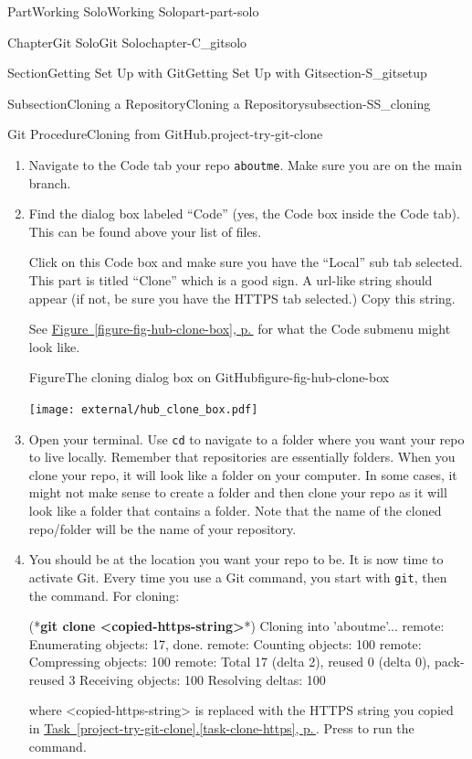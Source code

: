 \documentclass[twoside,10pt,]{book}
\newcommand{\xreffont}{\relax}
\newcommand{\mono}[1]{\texttt{#1}}
\newcommand{\consoleinput}[1]{\textbf{#1}}
\newcommand{\kbd}[1]{\keys{{#1}}}
\begin{document}
\begin{partptx}{Part}{Working Solo}{}{Working Solo}{}{}{part-part-solo}
\begin{chapterptx}{Chapter}{Git Solo}{}{Git Solo}{}{}{chapter-C_gitsolo}
\begin{sectionptx}{Section}{Getting Set Up with Git}{}{Getting Set Up with Git}{}{}{section-S_gitsetup}
\begin{subsectionptx}{Subsection}{Cloning a Repository}{}{Cloning a Repository}{}{}{subsection-SS_cloning}
\begin{project}{Git Procedure}{Cloning from GitHub.}{project-try-git-clone}
\begin{enumerate}[font=\bfseries,label=(\alph*),ref=\alph*]%
\item{}Navigate to the Code tab your repo \mono{aboutme}. Make sure you are on the main branch.%
\item\label{task-clone-https}Find the dialog box labeled ``Code'' (yes, the Code box inside the Code tab). This can be found above your list of files.%
\par
Click on this Code box and make sure you have the ``Local'' sub tab selected. This part is titled ``Clone'' which is a good sign. A url-like string should appear (if not, be sure you have the HTTPS tab selected.) Copy this string.%
\par
See \hyperref[figure-fig-hub-clone-box]{Figure~{\xreffont\ref{figure-fig-hub-clone-box}}, p.\,\pageref{figure-fig-hub-clone-box}} for what the Code submenu might look like.%
\begin{figureptx}{Figure}{The cloning dialog box on GitHub}{figure-fig-hub-clone-box}{}%
\begin{image}{0.2}{0.6}{0.2}{}%
\texttt{[image: external/hub\_clone\_box.pdf]}
\end{image}%
\tcblower
\end{figureptx}%
\item{}Open your terminal. Use \mono{cd} to navigate to a folder where you want your repo to live locally. Remember that repositories are essentially folders. When you clone your repo, it will look like a folder on your computer. In some cases, it might not make sense to create a folder and then clone your repo as it will look like a folder that contains a folder. Note that the name of the cloned repo\slash{}folder will be the name of your repository.%
\item{}You should be at the location you want your repo to be. It is now time to activate Git. Every time you use a Git command, you start with \mono{git}, then the command. For cloning:%
\begin{console}{0}{1}{0}
(*\consoleinput{git clone <copied-https-string>}*)
Cloning into 'aboutme'...
remote: Enumerating objects: 17, done.
remote: Counting objects: 100%
remote: Compressing objects: 100%
remote: Total 17 (delta 2), reused 0 (delta 0), pack-reused 3
Receiving objects: 100%
Resolving deltas: 100%
\end{console}
where \textless{}copied-https-string\textgreater{} is replaced with the HTTPS string you copied in \hyperref[task-clone-https]{Task~{\xreffont\ref{project-try-git-clone}}.{\xreffont\ref{task-clone-https}}, p.\,\pageref{task-clone-https}}. Press \kbd{Enter} to run the command.%

\end{enumerate}
\end{project}
\end{subsectionptx}
\end{sectionptx}
\end{chapterptx}
\end{partptx}
\end{document}
